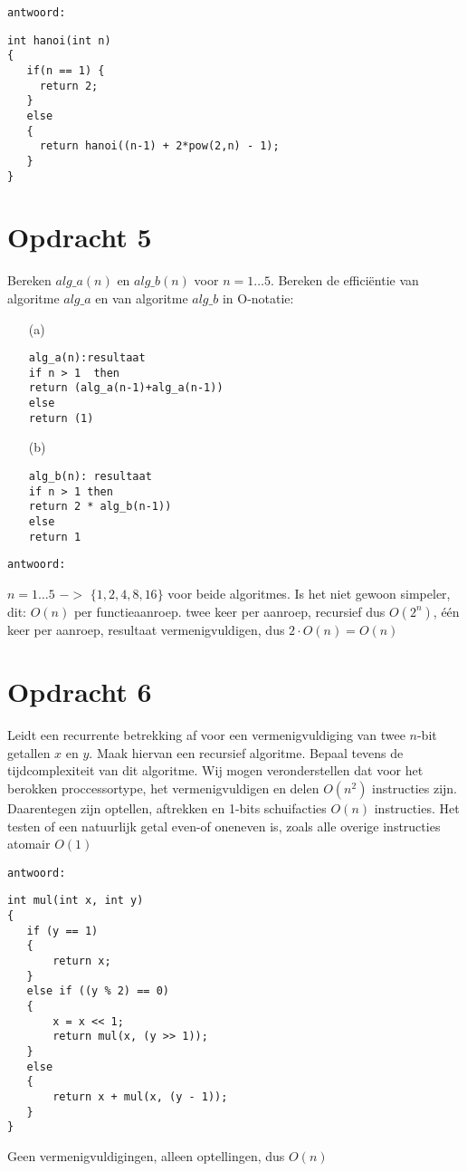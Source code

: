 \texttt{antwoord:}

\begin{lstlisting}
int hanoi(int n) 
{
   if(n == 1) {
     return 2;
   } 
   else 
   {
     return hanoi((n-1) + 2*pow(2,n) - 1);
   }
}
\end{lstlisting}

\section{Opdracht 5}
Bereken $alg\_a(n)$ en $alg\_b(n)$ voor $n=1\ldots 5$. Bereken de effici\"{e}ntie van algoritme $alg\_a$ en van algoritme $alg\_b$ in O-notatie:
\begin{itemize}
\item[(a)]\begin{lstlisting}
alg_a(n):resultaat
if n > 1  then
return (alg_a(n-1)+alg_a(n-1))
else
return (1)
\end{lstlisting}
\item[(b)]\begin{lstlisting}
alg_b(n): resultaat
if n > 1 then
return 2 * alg_b(n-1))
else
return 1
\end{lstlisting}
\end{itemize}

\texttt{antwoord:}

$n = 1\ldots{}5$ $->$ $\{1, 2, 4, 8, 16\}$ voor beide algoritmes.
Is het niet gewoon simpeler, dit:
$O(n)$ per functieaanroep.
twee keer per aanroep, recursief dus $O(2^n)$, \'{e}\'{e}n keer per aanroep, resultaat vermenigvuldigen, dus $ 2\cdot O(n) = O(n)$

\section{Opdracht 6}
Leidt een recurrente betrekking af voor een vermenigvuldiging van twee $n$-bit getallen $x$ en $y$. Maak hiervan een recursief algoritme. Bepaal tevens de tijdcomplexiteit van dit algoritme. Wij mogen veronderstellen dat voor het berokken proccessortype, het vermenigvuldigen en delen $O(n^2)$ instructies zijn. Daarentegen zijn optellen, aftrekken en 1-bits schuifacties $O(n)$ instructies. Het testen of een natuurlijk getal even-of oneneven is, zoals alle overige instructies atomair $O(1)$

\texttt{antwoord:}

\begin{lstlisting}
int mul(int x, int y) 
{
   if (y == 1) 
   {
       return x;
   } 
   else if ((y % 2) == 0) 
   {
       x = x << 1;
       return mul(x, (y >> 1));
   } 
   else 
   {
       return x + mul(x, (y - 1));
   }
}
\end{lstlisting}
Geen vermenigvuldigingen, alleen optellingen, dus $O(n)$

